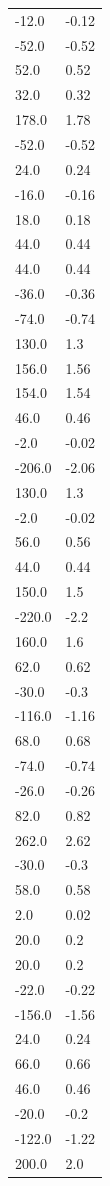 \begin{longtable}{ll}
-12.0 & -0.12 \\
-52.0 & -0.52 \\
52.0 & 0.52 \\
32.0 & 0.32 \\
178.0 & 1.78 \\
-52.0 & -0.52 \\
24.0 & 0.24 \\
-16.0 & -0.16 \\
18.0 & 0.18 \\
44.0 & 0.44 \\
44.0 & 0.44 \\
-36.0 & -0.36 \\
-74.0 & -0.74 \\
130.0 & 1.3 \\
156.0 & 1.56 \\
154.0 & 1.54 \\
46.0 & 0.46 \\
-2.0 & -0.02 \\
-206.0 & -2.06 \\
130.0 & 1.3 \\
-2.0 & -0.02 \\
56.0 & 0.56 \\
44.0 & 0.44 \\
150.0 & 1.5 \\
-220.0 & -2.2 \\
160.0 & 1.6 \\
62.0 & 0.62 \\
-30.0 & -0.3 \\
-116.0 & -1.16 \\
68.0 & 0.68 \\
-74.0 & -0.74 \\
-26.0 & -0.26 \\
82.0 & 0.82 \\
262.0 & 2.62 \\
-30.0 & -0.3 \\
58.0 & 0.58 \\
2.0 & 0.02 \\
20.0 & 0.2 \\
20.0 & 0.2 \\
-22.0 & -0.22 \\
-156.0 & -1.56 \\
24.0 & 0.24 \\
66.0 & 0.66 \\
46.0 & 0.46 \\
-20.0 & -0.2 \\
-122.0 & -1.22 \\
200.0 & 2.0 \\

\end{longtable}
